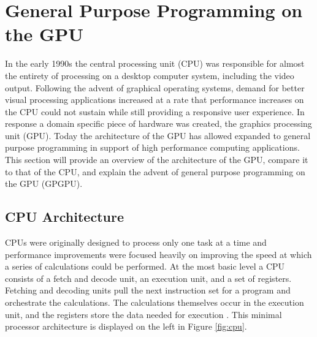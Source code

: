 \section{General Purpose Programming on the GPU}

In the early 1990s the central processing unit (CPU) was responsible for almost the entirety of processing on a desktop computer system, including the video output. Following the advent of graphical operating systems, demand for better visual processing applications increased at a rate that performance increases on the CPU could not sustain while still providing a responsive user experience. In response a domain specific piece of hardware was created, the graphics processing unit (GPU). Today the architecture of the GPU has allowed expanded to general purpose programming in support of high performance computing applications. This section will provide an overview of the architecture of the GPU, compare it to that of the CPU, and explain the advent of general purpose programming on the GPU (GPGPU).

\subsection{CPU Architecture}

CPUs were originally designed to process only one task at a time and performance improvements were focused heavily on improving the speed at which a series of calculations could be performed. At the most basic level a CPU consists of a fetch and decode unit, an execution unit, and a set of registers. Fetching and decoding units pull the next instruction set for a program and orchestrate the calculations. The calculations themselves occur in the execution unit, and the registers store the data needed for execution \cite{gpgpu}. This minimal processor architecture is displayed on the left in Figure \ref{fig:cpu}.

